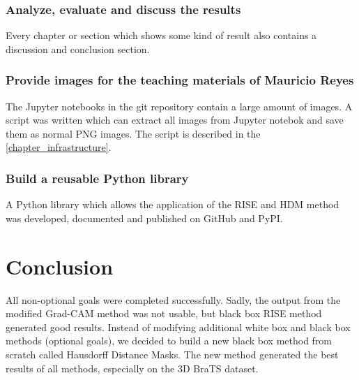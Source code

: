\subsubsection{Analyze, evaluate and discuss the results}
Every chapter or section which shows some kind of result also contains a discussion and conclusion section.

\subsubsection{Provide images for the teaching materials of Mauricio Reyes}
The Jupyter notebooks in the git repository contain a large amount of images. A script was written which can extract all images from Jupyter notebok and save them as normal PNG images. The script is described in the \autoref{chapter_infrastructure}.

\subsubsection{Build a reusable Python library}
A Python library which allows the application of the RISE and HDM method was developed, documented and published on GitHub and PyPI.

\section{Conclusion}
All non-optional goals were completed successfully. Sadly, the output from the modified Grad-CAM method was not usable, but black box RISE method generated good results. Instead of modifying additional white box and black box methods (optional goals), we decided to build a new black box method from scratch called Hausdorff Distance Masks. The new method generated the best results of all methods, especially on the 3D BraTS dataset.
